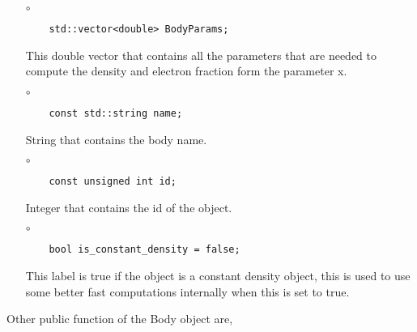 \begin{itemize}
\item[$\circ$]  
  \begin{lstlisting}
    std::vector<double> BodyParams;
  \end{lstlisting}
  This double vector that contains all the parameters that are
  needed to compute the density and electron fraction form the parameter
  {\ttf x}.
  
\item[$\circ$]
  \begin{lstlisting}
    const std::string name;
  \end{lstlisting}
  String that contains the body name.

\item[$\circ$]  
  \begin{lstlisting}
    const unsigned int id;
  \end{lstlisting}
  Integer that contains the id of the object.

\item[$\circ$]  
  \begin{lstlisting}
    bool is_constant_density = false;
  \end{lstlisting}  
  This label is true if the object is a constant density object, this is
  used to use some better fast computations internally when this is set to true.
\end{itemize}

Other public function of the {\ttf Body} object are,

